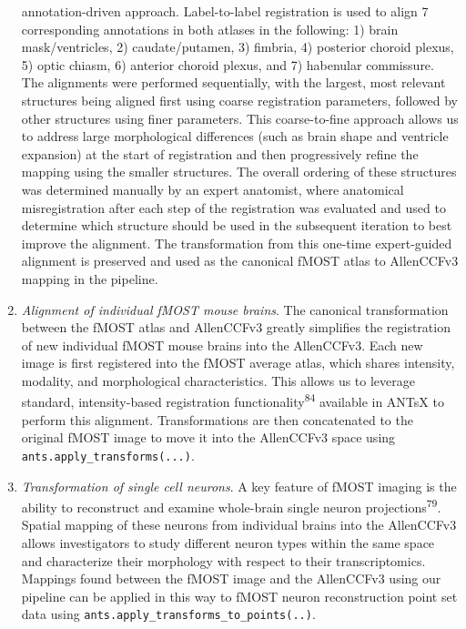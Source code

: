 \documentclass[
  12pt,
]{article}
\begin{document}
\begin{enumerate}
  annotation-driven approach. Label-to-label registration is used to
  align 7 corresponding annotations in both atlases in the following: 1)
  brain mask/ventricles, 2) caudate/putamen, 3) fimbria, 4) posterior
  choroid plexus, 5) optic chiasm, 6) anterior choroid plexus, and 7)
  habenular commissure. The alignments were performed sequentially, with
  the largest, most relevant structures being aligned first using coarse
  registration parameters, followed by other structures using finer
  parameters. This coarse-to-fine approach allows us to address large
  morphological differences (such as brain shape and ventricle
  expansion) at the start of registration and then progressively refine
  the mapping using the smaller structures. The overall ordering of
  these structures was determined manually by an expert anatomist, where
  anatomical misregistration after each step of the registration was
  evaluated and used to determine which structure should be used in the
  subsequent iteration to best improve the alignment. The transformation
  from this one-time expert-guided alignment is preserved and used as
  the canonical fMOST atlas to AllenCCFv3 mapping in the pipeline.
\item
  \emph{Alignment of individual fMOST mouse brains}. The canonical
  transformation between the fMOST atlas and AllenCCFv3 greatly
  simplifies the registration of new individual fMOST mouse brains into
  the AllenCCFv3. Each new image is first registered into the fMOST
  average atlas, which shares intensity, modality, and morphological
  characteristics. This allows us to leverage standard, intensity-based
  registration functionality\textsuperscript{84} available in ANTsX to
  perform this alignment. Transformations are then concatenated to the
  original fMOST image to move it into the AllenCCFv3 space using
  \texttt{ants.apply\_transforms(...)}.
\item
  \emph{Transformation of single cell neurons}. A key feature of fMOST
  imaging is the ability to reconstruct and examine whole-brain single
  neuron projections\textsuperscript{79}. Spatial mapping of these
  neurons from individual brains into the AllenCCFv3 allows
  investigators to study different neuron types within the same space
  and characterize their morphology with respect to their
  transcriptomics. Mappings found between the fMOST image and the
  AllenCCFv3 using our pipeline can be applied in this way to fMOST
  neuron reconstruction point set data using
  \texttt{ants.apply\_transforms\_to\_points(..)}.
\end{enumerate}
\end{document}
